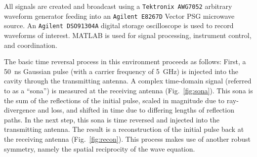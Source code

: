 All signals are created and broadcast
using a \texttt{Tektronix AWG7052} arbitrary waveform generator feeding into an
\texttt{Agilent E8267D} Vector PSG microwave source.
%
An \texttt{Agilent DSO91304A} digital storage oscilloscope is used to
record waveforms of interest. MATLAB is used for signal processing,
instrument control, and coordination.



The basic time reversal process in this environment proceeds as follows: First,
a 50~ns Gaussian pulse (with a carrier frequency of 5~GHz) is injected into
the cavity through the transmitting antenna.
%
A complex time-domain signal (referred to as a ``sona'') is measured at the receiving
antenna (Fig.~\ref{fig:sona}).
%
This sona is the sum of the reflections of the initial pulse, scaled in
magnitude due to ray-divergence and loss, and shifted in time due to differing
lengths of reflection paths.
%
In the next step, this sona is time reversed and injected into the transmitting
antenna.
%
The result is a reconstruction of the initial pulse back at the receiving
antenna (Fig.~\ref{fig:recon}).
%
This process makes use of another robust symmetry, namely the spatial
reciprocity of the wave equation.
